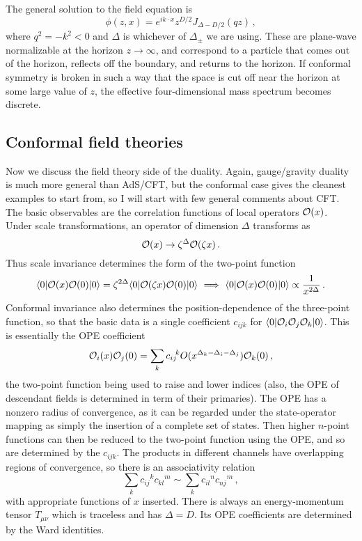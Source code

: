 \documentclass[12pt]{article}
\begin{document}
{The general solution to the field equation is
\begin{equation}
\phi(z,x) = e^{i k \cdot x} z^{D/2} J_{\Delta - D/2}(qz) \,,
\end{equation}
where $q^2 = - k^2 < 0$ and $\Delta$ is whichever of $\Delta_\pm$ we are using.  These are plane-wave normalizable at the horizon $z\to\infty$, and correspond to a particle that comes out of the horizon, reflects off the boundary, and returns to the horizon.  If conformal symmetry is broken in such a way that the space is cut off near the horizon at some large value of $z$, the effective four-dimensional mass spectrum becomes discrete.

\subsection{Conformal field theories}

Now we discuss the field theory side of the duality.   Again, gauge/gravity duality is much more general than AdS/CFT, but the conformal case gives the cleanest examples to start from, so I will start with few general comments about CFT.  The basic observables are the correlation functions of local operators ${\cal O}(x)$.  Under scale transformations, an operator of dimension $\Delta$ transforms as
\begin{equation}
{\cal O}(x) \to \zeta^\Delta {\cal O}(\zeta x) \,.
\end{equation}
Thus scale invariance determines the form of the two-point function
\begin{equation}
\langle 0 | {\cal O}(x) {\cal O}(0) | 0 \rangle = \zeta^{2\Delta}\langle 0 | {\cal O}(\zeta x) {\cal O}(0) | 0 \rangle \
\Longrightarrow\ \langle 0 | {\cal O}(x) {\cal O}(0) | 0 \rangle  \propto \frac{1}{x^{2\Delta}} \,.
\end{equation}
Conformal invariance also determines the position-dependence of the three-point function, so that the basic data is a single coefficient $c_{ijk}$ for $\langle 0 | {\cal O}_i {\cal O}_j {\cal O}_k  | 0 \rangle$.  This is essentially the OPE coefficient
\begin{equation}
{\cal O}_i(x) {\cal O}_j(0) = \sum_k c_{ij}\!^k O(x^{\Delta_k - \Delta_i - \Delta_j}) {\cal O}_k(0) \,,
\end{equation}
the two-point function being used to raise and lower indices (also, the OPE of descendant fields is determined in term of their primaries).
The OPE has a nonzero radius of convergence, as it can be regarded under the state-operator mapping as simply the insertion of a complete set of states.  Then higher $n$-point functions can then be reduced to the two-point function using the OPE, and so are determined by the $c_{ijk}$.  The products in different channels have overlapping regions of convergence, so there is an associativity relation
\begin{equation}
\sum_k c_{ij}\!^k c_{kl}\!^m \sim \sum_k c_{il}\!^n c_{nj}\!^m \,,
\end{equation}
with appropriate functions of $x$ inserted.  There is always an energy-momentum tensor $T_{\mu\nu}$ which is traceless and has $\Delta = D$.  Its OPE coefficients are determined by the Ward identities.

}
\end{document}
